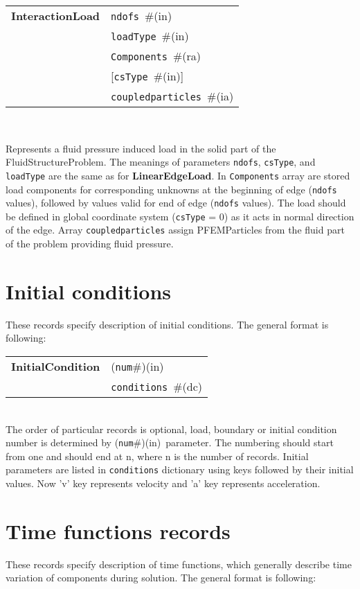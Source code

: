 \documentclass[a4paper]{report}
\newcommand{\param}[1]{\texttt{#1}} %
\newcommand{\optional}[1]{[#1]} %
\newcommand{\field}[2]{\param{#1}~\#{\tiny(#2)}} %
\newcommand{\optField}[2]{\optional{\field{#1}{#2}}}
\newcommand{\componentNum}{(\param{num}\#){\tiny(in)}} %
\newcommand{\entKeywordInst}[1]{\textbf{#1}} %
\newenvironment{record}[1][]{\begin{tabular}{|ll}}{\end{tabular}\\}
\newcommand{\recentry}[2]{{#1}&{#2}\\}
\newcounter{rcc}
\newenvironment{record}[1][\textwidth]{\setcounter{rcc}{0}\rowcolors{1}{lightgray}{lightgray}\tabularx{#1}{llR} \hline}
               {\endtabularx}
\newcommand{\recentry}[2]{\ifthenelse{\value{rcc}>0}{$\backslash$ \\}{\setcounter{rcc}{1}}{#1}&{#2}&}
\begin{document}
\begin{itemize}
\begin{record}[0.9\textwidth]
  \recentry{\entKeywordInst{InteractionLoad}}{\field{ndofs}{in}}
  \recentry{}{\field{loadType}{in}}
  \recentry{}{\field{Components}{ra}}
  \recentry{}{\optField{csType}{in}}
  \recentry{}{\field{coupledparticles}{ia}}
\end{record}

Represents a fluid pressure induced load in the solid part of the FluidStructureProblem. 
The meanings of parameters \param{ndofs},
\param{csType}, and \param{loadType} are the same as for
\entKeywordInst{LinearEdgeLoad}. In \param{Components}
array are stored load components for corresponding unknowns at the
beginning of edge (\param{ndofs} values), followed by values valid for
end of edge (\param{ndofs} values). The load should be defined in global 
coordinate system (\param{csType} = 0) as it acts in normal direction of the edge.
Array \param{coupledparticles} assign PFEMParticles from the fluid part of the problem 
providing fluid pressure.

\end{itemize}


\section{Initial conditions}
\label{_InitialConditions}
These records specify description of initial conditions. The general format is
following:

\noindent
\begin{record}
  \recentry{\entKeywordInst{InitialCondition}}{\componentNum}
  \recentry{}{\field{conditions}{dc}}
\end{record}
The order of particular  records is optional, load, boundary or initial condition number is determined by \componentNum\ parameter.
The numbering should start from one and should end at n, where n is the number of records.
Initial parameters are listed in \param{conditions} dictionary using keys followed by their initial values.
Now 'v' key represents velocity and 'a' key represents acceleration.



\section{Time functions records}
\label{_TimeFunctionsRecords}
These records specify description of time functions, which generally describe
time variation of components during solution. The  general format is
following:
\end{document}
